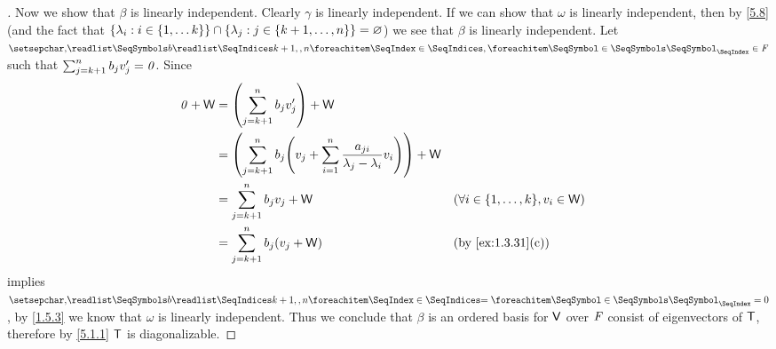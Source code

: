 \begin{proof}[]
  Now we show that \(\beta\) is linearly independent.
  Clearly \(\gamma\) is linearly independent.
  If we can show that \(\omega\) is linearly independent, then by \cref{5.8} (and the fact that \(\left\lbrace\lambda_i : i \in \left\lbrace1, \dots k\right\rbrace\right\rbrace \cap \left\lbrace\lambda_j : j \in \left\lbrace k + 1, \dots, n\right\rbrace\right\rbrace = \varnothing\)) we see that \(\beta\) is linearly independent.
  Let \(\seq{b}{k+1,,n} \in \F\) such that \(\sum_{j = k + 1}^n b_j v_j' = \mathit{0}\).
  Since
  \begin{align*}
    \zv + \W & = \pa{\sum_{j = k + 1}^n b_j v_j'} + \W                                                                                                                   \\
             & = \pa{\sum_{j = k + 1}^n b_j \pa{v_j + \sum_{i = 1}^n \frac{a_{j i}}{\lambda_j - \lambda_i} v_i}} + \W                                                    \\
             & = \sum_{j = k + 1}^n b_j v_j + \W                                                                      &  & (\forall i \in \set{1, \dots, k}, v_i \in \W) \\
             & = \sum_{j = k + 1}^n b_j (v_j + \W)                                                                    &  & \text{(by \cref{ex:1.3.31}(c))}
  \end{align*}
  implies \(\seq[=]{b}{k+1,,n} = 0\), by \cref{1.5.3} we know that \(\omega\) is linearly independent.
  Thus we conclude that \(\beta\) is an ordered basis for \(\mathsf{V}\) over \(\mathit{F}\) consist of eigenvectors of \(\mathsf{T}\), therefore by \cref{5.1.1} \(\mathsf{T}\) is diagonalizable.
\end{proof}

\begin{ex}\label{ex:5.4.32}

\end{ex}

\begin{ex}\label{ex:5.4.34}

\end{ex}

\begin{ex}\label{ex:5.4.36}

\end{ex}
